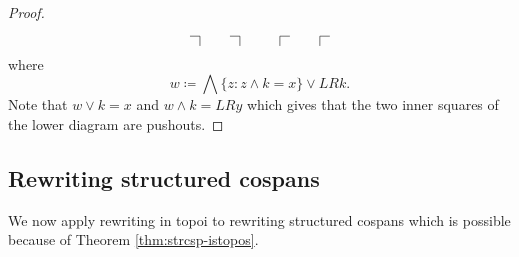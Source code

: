 \documentclass{amsart}
\theoremstyle{remark}
\theoremstyle{definition}
\begin{document}
\begin{proof}
\[\begin{tikzpicture}
\begin{scope}[shift={(0,0)}]
      \draw [-] (0.25,0.5) to node [] {} (0.5,0.5);
      \draw [-] (0.5,0.5) to node [] {} (0.5,0.25);
    \end{scope}
    \begin{scope}[shift={(1,0)}]
      \draw [-] (0.25,0.5) to node [] {} (0.5,0.5);
      \draw [-] (0.5,0.5) to node [] {} (0.5,0.25);
    \end{scope}
    \begin{scope}[shift={(2.5,0)}]
      \draw [-] (0,0.25) to (0,0.5);
      \draw [-] (0,0.5) to node [] {} (0.25,0.5);
    \end{scope}
    \begin{scope}[shift={(3.5,0)}]
      \draw [-] (0,0.25) to (0,0.5);
      \draw [-] (0,0.5) to node [] {} (0.25,0.5);
    \end{scope}
  \end{tikzpicture}
  \]
  where 
  \[
    w \coloneqq
    \bigwedge \{ z \colon z \wedge k = x \} \vee LRk.
  \]
  Note that $ w \vee k = x $ and $ w \wedge k = LRy $ which
  gives that the two inner squares of the lower diagram are
  pushouts.
\end{proof}


\subsection{Rewriting structured cospans}
\label{sec:Rewriting-StrCsp}

We now apply rewriting in topoi to rewriting structured
cospans which is possible because of Theorem
\ref{thm:strcsp-istopos}.
\end{document}
